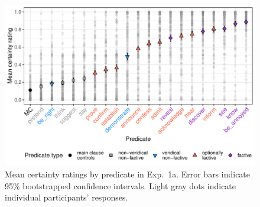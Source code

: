 \documentclass[11pt,fleqn]{article}
\newcommand{\6}{\mbox{$[\hspace*{-.6mm}[$}}
\newcommand{\9}{\mbox{$]\hspace*{-.6mm}]$}}
\begin{document}
\begin{figure}[H]
\centering

\includegraphics[width=.7\paperwidth]{../../results/5-projectivity-no-fact/graphs/means-projectivity-by-predicate-variability}

\caption{Mean certainty ratings by predicate in Exp.~1a. Error bars indicate 95\% bootstrapped confidence intervals. Light gray dots indicate individual participants' responses.} %
\label{f-projectivity}
\end{figure}




\end{document}
